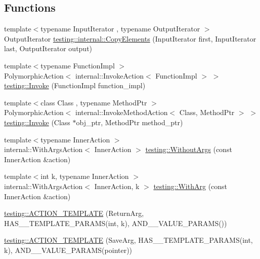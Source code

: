 \subsection*{Functions}
\begin{DoxyCompactItemize}
\item 
{\footnotesize template$<$typename Input\+Iterator , typename Output\+Iterator $>$ }\\Output\+Iterator \mbox{\hyperlink{namespacetesting_1_1internal_a9372c12747bcf964aacb1284f8048cae}{testing\+::internal\+::\+Copy\+Elements}} (Input\+Iterator first, Input\+Iterator last, Output\+Iterator output)
\item 
{\footnotesize template$<$typename Function\+Impl $>$ }\\Polymorphic\+Action$<$ internal\+::\+Invoke\+Action$<$ Function\+Impl $>$ $>$ \mbox{\hyperlink{namespacetesting_a12aebaf8363d49a383047529f798b694}{testing\+::\+Invoke}} (Function\+Impl function\+\_\+impl)
\item 
{\footnotesize template$<$class Class , typename Method\+Ptr $>$ }\\Polymorphic\+Action$<$ internal\+::\+Invoke\+Method\+Action$<$ Class, Method\+Ptr $>$ $>$ \mbox{\hyperlink{namespacetesting_a80b82dc382445d240ff011f9c34aefc4}{testing\+::\+Invoke}} (Class $\ast$obj\+\_\+ptr, Method\+Ptr method\+\_\+ptr)
\item 
{\footnotesize template$<$typename Inner\+Action $>$ }\\internal\+::\+With\+Args\+Action$<$ Inner\+Action $>$ \mbox{\hyperlink{namespacetesting_aeac85f74bd11112f69142e92e3a50780}{testing\+::\+Without\+Args}} (const Inner\+Action \&action)
\item 
{\footnotesize template$<$int k, typename Inner\+Action $>$ }\\internal\+::\+With\+Args\+Action$<$ Inner\+Action, k $>$ \mbox{\hyperlink{namespacetesting_af76590c6cecc621e1ab4b681a9ea209b}{testing\+::\+With\+Arg}} (const Inner\+Action \&action)
\item 
\mbox{\hyperlink{namespacetesting_a109d48f969260878ed1e743006196992}{testing\+::\+A\+C\+T\+I\+O\+N\+\_\+\+T\+E\+M\+P\+L\+A\+TE}} (Return\+Arg, H\+A\+S\+\_\+\_\+\+T\+E\+M\+P\+L\+A\+T\+E\+\_\+\+P\+A\+R\+A\+MS(int, k), A\+N\+D\+\_\+\_\+\+V\+A\+L\+U\+E\+\_\+\+P\+A\+R\+A\+MS())
\item 
\mbox{\hyperlink{namespacetesting_a0478a3464d31f6726d5bc47b1be46491}{testing\+::\+A\+C\+T\+I\+O\+N\+\_\+\+T\+E\+M\+P\+L\+A\+TE}} (Save\+Arg, H\+A\+S\+\_\+\_\+\+T\+E\+M\+P\+L\+A\+T\+E\+\_\+\+P\+A\+R\+A\+MS(int, k), A\+N\+D\+\_\+\_\+\+V\+A\+L\+U\+E\+\_\+\+P\+A\+R\+A\+MS(pointer))

\end{DoxyCompactItemize}
